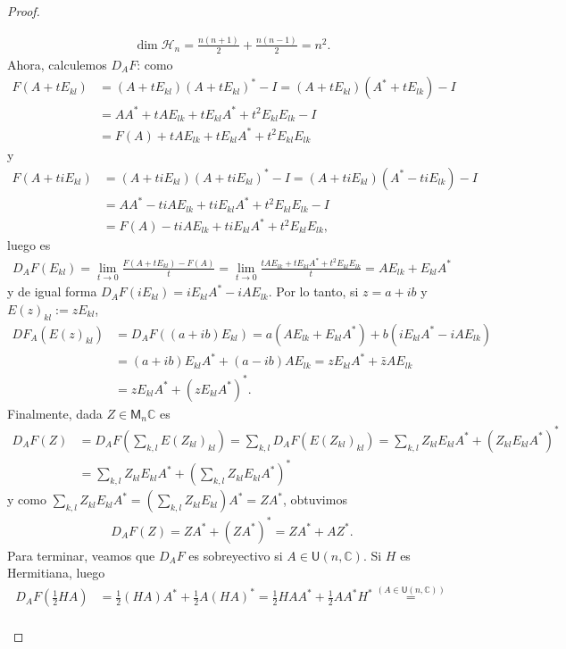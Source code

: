 \documentclass[11pt]{article}
\newcommand{\C}{\mathbb{C}}
\newcommand{\M}[2]{\mathsf{M}_{#1}#2}
\begin{document}
\begin{proof}
\begin{itemize}
\begin{align*}
\dim \mathcal{H}_n = \frac{n(n+1)}{2} + \frac{n(n-1)}{2} = n^2.
\end{align*}
Ahora, calculemos $D_AF$: como 
\begin{align*}
F(A+tE_{kl}) &= (A+tE_{kl})(A+tE_{kl})^* -I = (A+tE_{kl})(A^*+tE_{lk}) -I\\
& = AA^* + tAE_{lk} + tE_{kl}A^* +t^2E_{kl}E_{lk} -I\\
& = F(A) + tAE_{lk} + tE_{kl}A^* +t^2E_{kl}E_{lk}
\end{align*}
y
\begin{align*}
F(A+tiE_{kl}) &= (A+tiE_{kl})(A+tiE_{kl})^* -I = (A+tiE_{kl})(A^*-tiE_{lk}) -I\\
& = AA^* - tiAE_{lk} + tiE_{kl}A^* + t^2E_{kl}E_{lk} -I\\
& = F(A) - tiAE_{lk} + tiE_{kl}A^* + t^2E_{kl}E_{lk},
\end{align*}
luego es
\begin{align*}
D_AF(E_{kl}) = \lim_{t \to 0}\frac{F(A+tE_{kl})-F(A)}{t} = \lim_{t \to 0}\frac{tAE_{lk} + tE_{kl}A^* +t^2E_{kl}E_{lk}}{t} =  AE_{lk} + E_{kl}A^*
\end{align*}
y de igual forma $D_AF(iE_{kl}) = iE_{kl}A^*-iAE_{lk}$. Por lo tanto, si $z = a+ib$ y $E(z)_{kl} := zE_{kl}$,
\begin{align*}
DF_A(E(z)_{kl}) &= D_AF((a+ib)E_{kl}) = a(AE_{lk} + E_{kl}A^*)+b(iE_{kl}A^*-iAE_{lk})\\
& = (a+ib)E_{kl}A^* + (a-ib)AE_{lk} = zE_{kl}A^* + \bar{z}AE_{lk}\\
& = zE_{kl}A^* + (zE_{kl}A^*)^*.
\end{align*} 
Finalmente, dada $Z \in \M{n}{\C}$ es
\begin{align*}
D_AF(Z) & = D_AF\left(\sum_{k,l}E(Z_{kl})_{kl}\right) = \sum_{k,l} D_AF(E(Z_{kl})_{kl}) = \sum_{k,l} Z_{kl}E_{kl}A^* + (Z_{kl}E_{kl}A^*)^*\\
& = \sum_{k,l} Z_{kl}E_{kl}A^* + \left(\sum_{k,l}Z_{kl}E_{kl}A^*\right)^*
\end{align*}
y como $\sum_{k,l} Z_{kl}E_{kl}A^* = \left(\sum_{k,l} Z_{kl}E_{kl}\right)A^* = ZA^*$, obtuvimos
\begin{align*}
D_AF(Z) = ZA^* + (ZA^*)^* = ZA^*+AZ^*.
\end{align*}
Para terminar, veamos que $D_AF$ es sobreyectivo si $A \in \mathsf{U}(n,\C)$. Si $H$ es Hermitiana, luego 
\begin{align*}
D_AF\left(\frac{1}{2}HA\right) &= \frac{1}{2}(HA)A^* + \frac{1}{2}A(HA)^* = \frac{1}{2}HAA^* + \frac{1}{2}AA^*H^* \stackrel{(A \in \mathsf{U}(n,\C))}{=}\\

\end{align*}
\end{itemize}
\end{proof}
\end{document}
